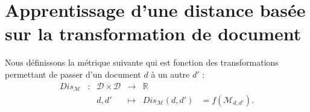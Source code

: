 



\section{Apprentissage d'une distance basée sur la transformation de document}
Nous définissons la métrique suivante qui est fonction des transformations permettant de passer d'un document $d$ à un autre $d'$ :
\begin{equation}
\begin{array}{cccccc}
Dis_\mathcal{M} & : & \mathcal{D} \times \mathcal{D} & \to & \mathbb{R} & \\
& & d, d' & \mapsto & Dis_{\mathcal{M}}(d, d') & = f(\mathcal{M}_{d, d'}). \\
\end{array} \label{eq:similarite:distance-modif}
\end{equation}

